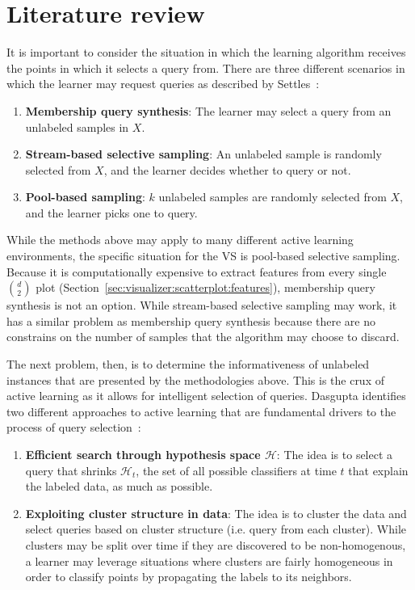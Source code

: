 \section{Literature review}
\label{sec:al:litreview}

It is important to consider the situation in which the learning algorithm 
receives the points in which it selects a query from. There are three different 
scenarios in which the learner may request queries as described by 
Settles~\cite{settles2010}:
 
\tablespacing
\begin{enumerate}
	\item \textbf{Membership query synthesis}: The learner may select a query 
	from an unlabeled samples in $X$.
	\item \textbf{Stream-based selective sampling}: An unlabeled sample is 
	randomly selected from $X$, and the learner decides whether to query or not.
	\item \textbf{Pool-based sampling}: $k$ unlabeled samples are randomly 
	selected from $X$, and the learner picks one to query.
\end{enumerate}
\bodyspacing

\noindent While the methods above may apply to many different active learning 
environments, the specific situation for the VS is pool-based selective 
sampling. Because it is computationally expensive to extract features from 
every single $d\choose2$ plot 
(Section~\ref{sec:visualizer:scatterplot:features}), membership query synthesis 
is not an option. While stream-based selective sampling may work, it has a 
similar problem as membership query synthesis because there are no constrains
on the number of samples that the algorithm may choose to discard. 

The next problem, then, is to determine the informativeness of unlabeled 
instances that are presented by the methodologies above. This is the crux of 
active learning as it allows for intelligent selection of queries.
Dasgupta identifies two different approaches to active learning that are 
fundamental drivers to the process of query selection~\cite{dasgupta2011}: 

\tablespacing
\begin{enumerate}
	\item \textbf{Efficient search through hypothesis space $\mathcal{H}$}: 
	The idea is to select a query that shrinks $\mathcal{H}_t$, the set of all 
	possible classifiers at time $t$ that explain the labeled data, as much as 
	possible. 
	\item \textbf{Exploiting cluster structure in data}: 
	The idea is to cluster the data and select queries based on cluster 
	structure (i.e. query from each cluster). While clusters may be split over 
	time if they are discovered to be non-homogenous, a learner may leverage 
	situations where clusters are fairly homogeneous in order to classify 
	points by propagating the labels to its neighbors. 
\end{enumerate}
\bodyspacing

